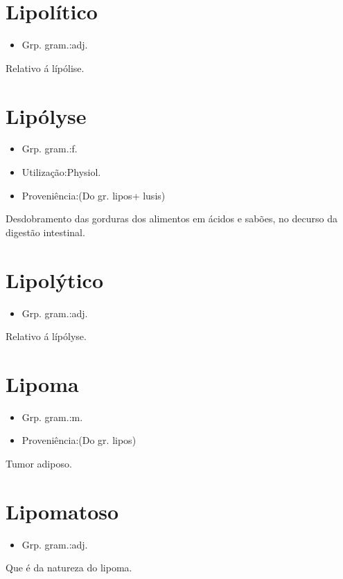 \section{Lipolítico}
\begin{itemize}
\item {Grp. gram.:adj.}
\end{itemize}
Relativo á lípólise.
\section{Lipólyse}
\begin{itemize}
\item {Grp. gram.:f.}
\end{itemize}
\begin{itemize}
\item {Utilização:Physiol.}
\end{itemize}
\begin{itemize}
\item {Proveniência:(Do gr. \textunderscore lipos\textunderscore  + \textunderscore lusis\textunderscore )}
\end{itemize}
Desdobramento das gorduras dos alimentos em ácidos e sabões, no decurso da digestão intestinal.
\section{Lipolýtico}
\begin{itemize}
\item {Grp. gram.:adj.}
\end{itemize}
Relativo á lípólyse.
\section{Lipoma}
\begin{itemize}
\item {Grp. gram.:m.}
\end{itemize}
\begin{itemize}
\item {Proveniência:(Do gr. \textunderscore lipos\textunderscore )}
\end{itemize}
Tumor adiposo.
\section{Lipomatoso}
\begin{itemize}
\item {Grp. gram.:adj.}
\end{itemize}
Que é da natureza do lipoma.
